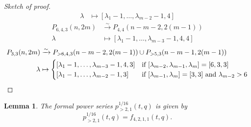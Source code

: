\documentclass[12pt, reqno]{amsart}
\newtheorem{lemma}[theorem]{Lemma}
\theoremstyle{remark}
\begin{document}
\begin{proof}[Sketch of proof]
\begin{align*}
    \lambda &\mapsto [\lambda_1 - 1, \dots, \lambda_{m - 2} - 1, 4]
  \end{align*}
  \begin{align*}
    P_{6, 4, 3}(n, 2m) &\xrightarrow{\sim} P_{4, 4}(n - m - 2, 2(m - 1)) \\
    \lambda &\mapsto [\lambda_1 - 1, \dots, \lambda_{m - 3} - 1, 4, 4]
  \end{align*}
  \begin{align*}
    P_{3, 3}(n, 2m) &\xrightarrow{\sim} P_{>6, 4, 3}(n - m - 2, 2(m - 1)) \cup P_{>5, 3}(n - m - 1, 2(m - 1)) \\
    \lambda &\mapsto
              \begin{cases}
                [\lambda_1 - 1, \dots, \lambda_{m - 3} - 1, 4, 3] &\text{if }[\lambda_{m - 2}, \lambda_{m - 1}, \lambda_m] = [6, 3, 3] \\
                [\lambda_1 - 1, \dots, \lambda_{m - 2} - 1, 3] &\text{if }[\lambda_{m - 1}, \lambda_m] = [3, 3]\text{ and }\lambda_{m - 2} > 6 \qedhere
              \end{cases}
  \end{align*}
\end{proof}

\begin{lemma}
  \label{lmm:13}
  The formal power series $p^{1/16}_{>2, 1}(t, q)$ is given by
  \begin{equation*}
    p^{1/16}_{>2, 1}(t, q) = f_{4, 2, 1, 1}(t, q).
  \end{equation*}
\end{lemma}
\end{document}
